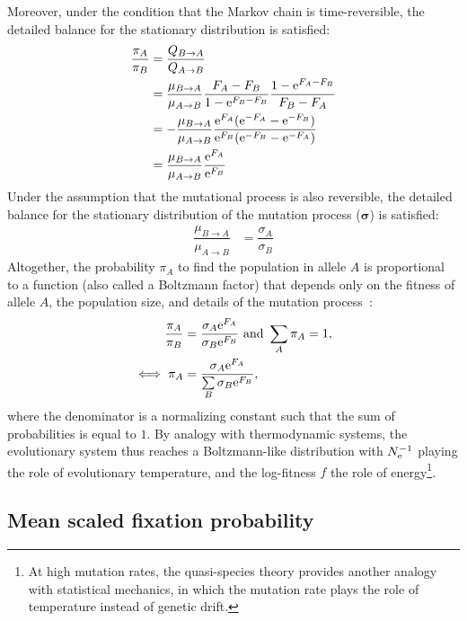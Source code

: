 Moreover, under the condition that the Markov chain is time-reversible, the detailed balance for the stationary distribution is satisfied:
\begin{align}
    \dfrac{\pi_{A}}{\pi_{B}} & = \dfrac{Q_{B \to A}}{Q_{A \to B}} \\
    & = \dfrac{\mu_{B \to A}}{\mu_{A \to B}}  \dfrac{F_{A}-F_{B}}{ 1 - \mathrm{e}^{F_{B}-F_{B}}}  \dfrac{1 - \mathrm{e}^{F_{A} - F_{B}} }{F_{B} - F_{A}}\\
    & = - \dfrac{\mu_{B \to A}}{\mu_{A \to B}}  \dfrac{ \mathrm{e}^{F_{A}}(\mathrm{e}^{-F_{A}} - \mathrm{e}^{- F_{B}}) }{ \mathrm{e}^{F_{B}}(\mathrm{e}^{-F_{B}} - \mathrm{e}^{- F_{A}})}  \\
    & = \dfrac{\mu_{B \to A}}{\mu_{A \to B}} \dfrac{\mathrm{e}^{F_{A}}}{\mathrm{e}^{F_{B}}} \\
\end{align}
Under the assumption that the mutational process is also reversible, the detailed balance for the stationary distribution of the mutation process ($\bm{\sigma}$) is satisfied:
\begin{align}
    \dfrac{\mu_{B \to A}}{\mu_{A \to B}} & = \dfrac{\sigma_{A}}{\sigma_{B}}
\end{align}
Altogether, the probability $\pi_{A}$ to find the population in allele $A$ is proportional to a function (also called a Boltzmann factor) that depends only on the fitness of allele $A$, the population size, and details of the mutation process~\citep{Sella2005,Mustonen2005}:
\begin{align}
    \dfrac{\pi_{A}}{\pi_{B}} & = \dfrac{\sigma_{A}\mathrm{e}^{F_{A}}}{\sigma_{B}\mathrm{e}^{F_{B}}} \text{ and } \sum\limits_{A}\pi_{A} = 1, \\
    \iff \pi_{A} & = \dfrac{\sigma_{A}\mathrm{e}^{F_{A}}}{\sum\limits_{B} \sigma_{B}\mathrm{e}^{F_{B}} }, \label{eq:equilibrium-mut-sel}
\end{align}
where the denominator is a normalizing constant such that the sum of probabilities is equal to $1$.
By analogy with thermodynamic systems, the evolutionary system thus reaches a Boltzmann-like distribution with $N_{\textrm{e}}^{-1}$ playing the role of evolutionary temperature, and the log-fitness $f$ the role of energy\footnote{At high mutation rates, the quasi-species theory provides another analogy with statistical mechanics, in which the mutation rate plays the role of temperature instead of genetic drift.}.

\subsection{Mean scaled fixation probability}
\label{subsec:mean-scaled-fixation-probability}

